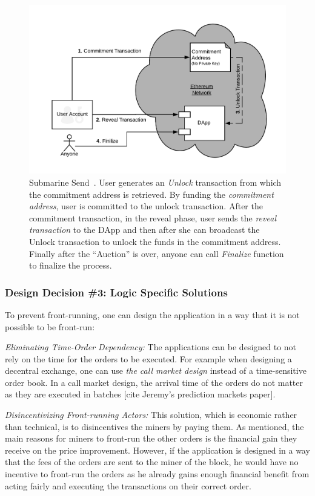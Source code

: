 \begin{figure}[h]
\centering
\includegraphics[width=0.5\linewidth]{figures/LibSubmarine.png}
\caption{ Submarine Send~\cite{libsubmarine}. User generates an \textit{Unlock} transaction from which the commitment address is retrieved. By funding the \textit{commitment address}, user is committed to the unlock transaction. After the commitment transaction, in the reveal phase, user sends the \textit{reveal transaction} to the DApp and then after she can broadcast the Unlock transaction to unlock the funds in the commitment address. Finally after the ``Auction'' is over, anyone can call \textit{Finalize} function to finalize the process.  \label{fig:LibSubmarine}}
\end{figure}


\subsubsection{Design Decision \#3: Logic Specific Solutions\newline}
To prevent front-running, one can design the application in a way that it is not possible to be front-run:

\noindent\emph{Eliminating Time-Order Dependency:} The applications can be designed to not rely on the time for the orders to be executed. For example when designing a decentral exchange, one can use \emph{the call market design} instead of a time-sensitive order book. In a call market design, the arrival time of the orders do not matter as they are executed in batches [cite Jeremy's prediction markets paper]. 

\noindent\emph{Disincentivizing Front-running Actors:} This solution, which is economic rather than technical, is to disincentives the miners by paying them. As mentioned, the main reasons for miners to front-run the other orders is the financial gain they receive on the price improvement. However, if the application is designed in a way that the fees of the orders are sent to the miner of the block, he would have no incentive to front-run the orders as he already gains enough financial benefit from acting fairly and executing the transactions on their correct order.

